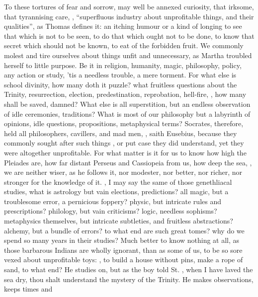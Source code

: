 To these tortures of fear and sorrow, may well be annexed curiosity, that
irksome, that tyrannising care, ,
\enquote{superfluous industry about unprofitable things, and their
qualities}, as Thomas defines it: an itching humour or a kind of longing to see
that which is not to be seen, to do that which ought not to be done, to know
that secret which should not be known, to eat of the
forbidden fruit. We commonly molest and tire ourselves about things unfit and
unnecessary, as Martha troubled herself to little purpose. Be it in religion,
humanity, magic, philosophy, policy, any action or study, 'tis a needless
trouble, a mere torment. For what else is school divinity, how many doth it
puzzle? what fruitless questions about the Trinity, resurrection, election,
predestination, reprobation, hell-fire, \etc{}, how many shall be saved,
damned? What else is all superstition, but an endless observation of idle
ceremonies, traditions? What is most of our philosophy but a labyrinth of
opinions, idle questions, propositions, metaphysical terms? Socrates,
therefore, held all philosophers, cavillers, and mad men, , saith
Eusebius, because they commonly sought after such things
, or put case they did
understand, yet they were altogether unprofitable. For what matter is it for us
to know how high the Pleiades are, how far distant Perseus and Cassiopeia from
us, how deep the sea, \etc{}, we are neither wiser, as he follows it, nor
modester, nor better, nor richer, nor stronger for the knowledge of it.
, I may say the same of those genethliacal
studies, what is astrology but vain elections, predictions? all magic, but a
troublesome error, a pernicious foppery? physic, but intricate rules and
prescriptions? philology, but vain criticisms? logic, needless sophisms?
metaphysics themselves, but intricate subtleties, and fruitless abstractions?
alchemy, but a bundle of errors? to what end are such great tomes? why do we
spend so many years in their studies? Much better to know nothing at all, as
those barbarous Indians are wholly ignorant, than as some of us, to be so sore
vexed about unprofitable toys: , to build a
house without pins, make a rope of sand, to what end?  He studies
on, but as the boy told St. \Austin{}, when I have laved the sea dry, thou shalt
understand the mystery of the Trinity. He makes observations, keeps times and
